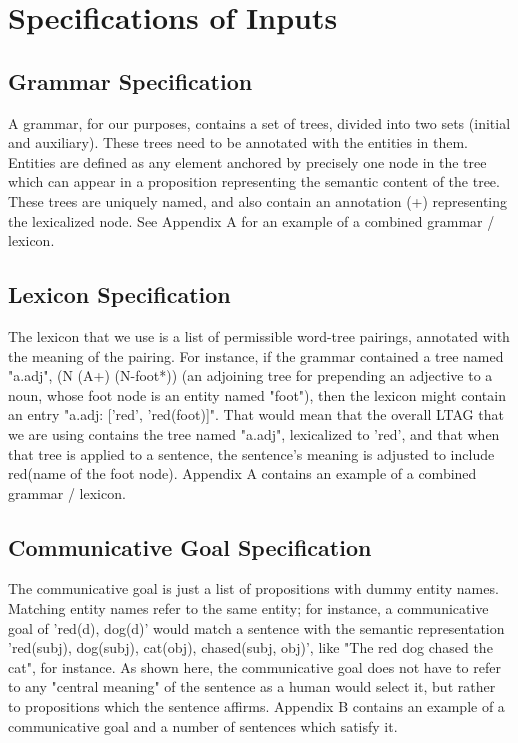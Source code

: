 \section{Specifications of Inputs}

\subsection{Grammar Specification}

A grammar, for our purposes, contains a set of trees, divided into two sets (initial and auxiliary).
These trees need to be annotated with the entities in them.  Entities are defined as any element
anchored by precisely one node in the tree which can appear in a proposition representing the
semantic content of the tree.  These trees are uniquely named, and also contain an
annotation (+) representing the lexicalized node.  See Appendix A for an example of a combined
grammar / lexicon.

\subsection{Lexicon Specification}

The lexicon that we use is a list of permissible word-tree pairings, annotated with the meaning of
the pairing.  For instance, if the grammar contained a tree named "a.adj", (N (A+) (N-foot*))
(an adjoining tree for prepending an adjective to a noun, whose foot node is an entity named "foot"),
then the lexicon might contain an entry "a.adj: ['red', 'red(foot)]".  That would mean that the overall
LTAG that we are using contains the tree named "a.adj", lexicalized to 'red', and that when that tree
is applied to a sentence, the sentence's meaning is adjusted to include red(name of the foot node).
Appendix A contains an example of a combined grammar / lexicon.

\subsection{Communicative Goal Specification}

The communicative goal is just a list of propositions with dummy entity names.  Matching entity
names refer to the same entity; for instance, a communicative goal of 'red(d), dog(d)' would
match a sentence with the semantic representation 'red(subj), dog(subj), cat(obj), chased(subj, obj)',
like "The red dog chased the cat", for instance.  As shown here, the communicative goal does
not have to refer to any "central meaning" of the sentence as a human would select it, but rather
to propositions which the sentence affirms.  Appendix B contains an example of a communicative
goal and a number of sentences which satisfy it.


